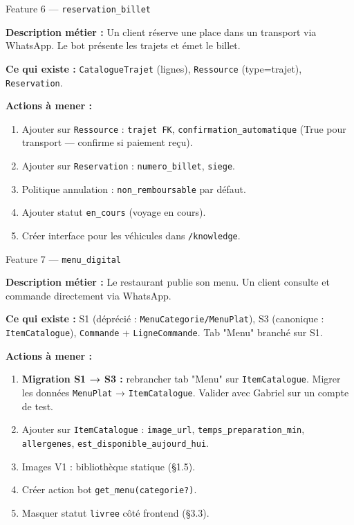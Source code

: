 \documentclass[11pt,a4paper]{article}
\newcommand{\slug}[1]{\texttt{\color{AGTDark}#1}}
\newcommand{\priom}[1]{\textcolor{AGTOrange}{\textbf{#1}}}
\begin{document}
\bigskip

\begin{featurebox}{Feature 6 — \slug{reservation\_billet}}

\textbf{Description métier :} Un client réserve une place dans un transport via
WhatsApp. Le bot présente les trajets et émet le billet.

\textbf{Ce qui existe :} \slug{CatalogueTrajet} (lignes), \slug{Ressource}
(type=trajet), \slug{Reservation}.

\medskip
\textbf{Actions à mener :}
\begin{enumerate}
  \item Ajouter sur \slug{Ressource} : \slug{trajet FK}, \slug{confirmation\_automatique}
        (True pour transport — confirme si paiement reçu).
  \item Ajouter sur \slug{Reservation} : \slug{numero\_billet}, \slug{siege}.
  \item Politique annulation : \texttt{non\_remboursable} par défaut.
  \item Ajouter statut \texttt{en\_cours} (voyage en cours).
  \item Créer interface pour les véhicules dans \texttt{/knowledge}.
\end{enumerate}

\end{featurebox}

\bigskip

\begin{featurebox}{Feature 7 — \slug{menu\_digital}}

\textbf{Description métier :} Le restaurant publie son menu. Un client consulte
et commande directement via WhatsApp.

\textbf{Ce qui existe :} S1 (déprécié : \slug{MenuCategorie/MenuPlat}), S3
(canonique : \slug{ItemCatalogue}), \slug{Commande} + \slug{LigneCommande}.
Tab "Menu" branché sur S1.

\medskip
\textbf{Actions à mener :}
\begin{enumerate}
  \item \priom{Migration S1 → S3 :} rebrancher tab "Menu" sur \slug{ItemCatalogue}.
        Migrer les données \slug{MenuPlat} → \slug{ItemCatalogue}.
        Valider avec Gabriel sur un compte de test.
  \item Ajouter sur \slug{ItemCatalogue} : \slug{image\_url},
        \slug{temps\_preparation\_min}, \slug{allergenes},
        \slug{est\_disponible\_aujourd\_hui}.
  \item Images V1 : bibliothèque statique (§1.5).
  \item Créer action bot \slug{get\_menu(categorie?)}.
  \item Masquer statut \texttt{livree} côté frontend (§3.3).
\end{enumerate}

\end{featurebox}
\end{document}
